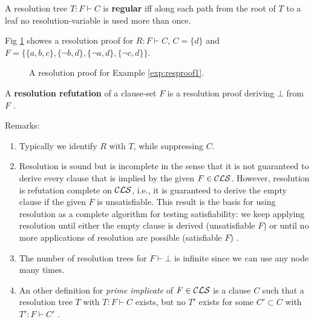 \documentclass[12pt]{book}
\begin{document}
\begin{defi}\label{def:treg_ree}
   A resolution tree $T : F \vdash C$ is \textbf{regular} iff along each path from the root of $T$ to a leaf 
   no resolution-variable is used more than once. 
\end{defi}
 \begin{examp}\label{exp:resproof1}
      Fig \ref{fig:proof1} showes a resolution proof for  $R: F \vdash C$, $C=\{d\}$ and $F = \{\{a,b,c\},\{\neg b,d\},\{\neg a, d\},\{\neg c, d\}\}$. 
	   \begin{figure}
	   \centering  
	   \caption{A resolution proof for Example \ref{exp:resproof1}.}
	   \label{fig:proof1}
       \end{figure}
\end{examp}

\begin{defi}\label{def:resrefutation}
  A \textbf{resolution refutation} of a clause-set $F$ is a resolution proof deriving $\bot$ from $F$ \cite{h5}. 
\end{defi}
  
Remarks:
\begin{enumerate}
      \item Typically we identify $R$ with $T$, while suppressing $C$.
	  \item Resolution is sound but is incomplete in the sense that it is not guaranteed to derive every clause that is implied by the given $F \in \mathcal{CLS}$. 
	  However, resolution is refutation complete on $\mathcal{CLS}$, i.e., it is guaranteed to derive the empty clause if the given $F$ is unsatisfiable. 
	  This result is the basis for using resolution as a complete algorithm for testing satisfiability: we keep applying resolution until either 
	  the empty clause is derived (unsatisfiable $F$) or until no more applications of resolution are possible (satisfiable $F$) \cite{h6}.
	  \item The number of resolution trees for $F \vdash \bot$ is infinite since we can use any node many times.
	  \item An other definition for \emph{prime implicate} of $F \in \mathcal{CLS}$ is a clause $C$ such that a resolution tree 
	  $T$ with $T: F \vdash C$ exists, but no $T'$ exists for some $C' \subset C$ with $T': F \vdash C'$ \cite{h11}.

\end{enumerate}
\end{document}
